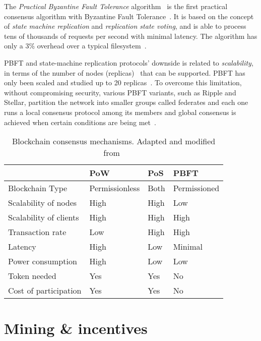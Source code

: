 The \textit{Practical Byzantine Fault Tolerance} algorithm~\cite{Castro:1999:PBF:296806.296824} is the first practical consensus algorithm with Byzantine Fault Tolerance~\cite{byzantine_fault_tolerance}.
It is based on the concept of \textit{state machine replication} and \textit{replication state voting}, and is able to process tens of thousands of requests per second with minimal latency.
The algorithm has only a 3\% overhead over a typical filesystem~\cite{Castro:1999:PBF:296806.296824}.

PBFT and state-machine replication protocols’ downside is related to \textit{scalability}, in terms of the number of nodes (replicas)~\cite{Vukolić2016} that can be supported.
PBFT has only been scaled and studied up to 20 replicas~\cite{bl_consensus,Vukolić2016}. To overcome this limitation, without compromising security, various PBFT variants,
such as Ripple and Stellar, partition the network into smaller groups called federates and each one runs a local consensus protocol among its members and
global consensus is achieved when certain conditions are being met~\cite{DBLP:journals/corr/abs-1708-05665}.

\begin{table}[!ht]
  \centering
  \caption{Blockchain consensus mechanisms. Adapted and modified from~\cite{bl_consensus,Vukolić2016}}
  \begin{tabular}{|l|l|l|l|}
    \hline
    & PoW &	PoS &	PBFT \\ \hline
    Blockchain Type &	Permissionless &	Both &	Permissioned \\ \hline
    Scalability of nodes &	High &	High &	Low \\ \hline
    Scalability of clients &	High &	High &	High \\ \hline
    Transaction rate &	Low &	High &	High \\ \hline
    Latency &	High &	Low &	Minimal \\ \hline
    Power consumption &	High &	Low &	Low \\ \hline
    Token needed &	Yes &	Yes &	No \\ \hline
    Cost of participation &	Yes &	Yes &	No \\ \hline
  \end{tabular}
  \label{table:blockchain_consensus}
\end{table}

\section{Mining \& incentives}\label{blockchain:mining}

